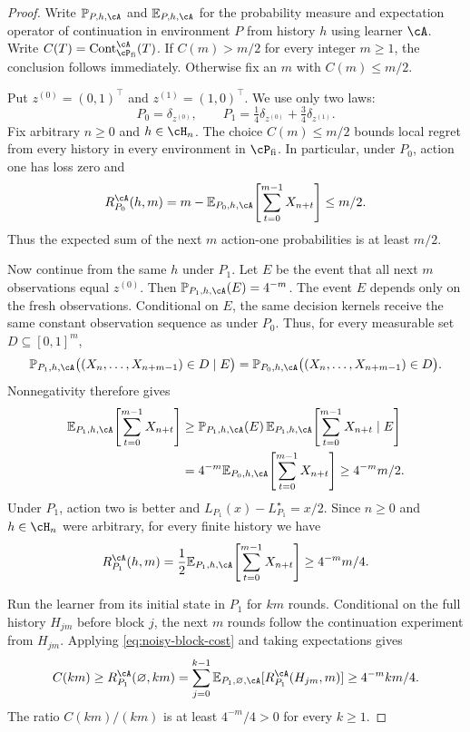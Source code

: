 \documentclass[11pt,twoside]{article}
\newcommand{\E}{\mathbb E}
\renewcommand{\P}{\mathbb P}
\theoremstyle{definition}
\theoremstyle{remark}
\DeclareMathOperator{\Cont}{Cont}
\begin{document}
\begin{proof}
Write $\P_{P,h,\cA}$ and $\E_{P,h,\cA}$ for the probability measure and
expectation operator of continuation in environment $P$ from history $h$
using learner $\cA$.
Write $C(T)=\Cont_{\cP_{\rm fi}}^{\cA}(T)$. If $C(m)>m/2$ for every
integer $m\ge1$, the conclusion follows immediately. Otherwise fix an
$m$ with $C(m)\le m/2$.

Put $z^{(0)}=(0,1)^\top$ and $z^{(1)}=(1,0)^\top$. We use only two laws:
\[
 P_0=\delta_{z^{(0)}},\qquad
 P_1=\tfrac14\delta_{z^{(0)}}+\tfrac34\delta_{z^{(1)}}.
\]
Fix arbitrary $n\ge0$ and $h\in\cH_n$. The choice $C(m)\le m/2$
bounds local regret from every history in every environment in
$\cP_{\rm fi}$. In particular, under $P_0$, action one has loss zero and
\[
 R_{P_0}^{\cA}(h,m)
 =m-\E_{P_0,h,\cA}\!\left[\sum_{t=0}^{m-1}X_{n+t}\right]\le m/2.
\]
Thus the expected sum of the next $m$ action-one probabilities is at least
$m/2$.

Now continue from the same $h$ under $P_1$. Let $E$ be the event
that all next $m$ observations equal $z^{(0)}$. Then
$\P_{P_1,h,\cA}(E)=4^{-m}$.
The event $E$ depends only on the fresh observations. Conditional on $E$,
the same decision kernels receive the same constant observation sequence
as under $P_0$. Thus, for every measurable set $D\subseteq[0,1]^m$,
\[
 \P_{P_1,h,\cA}\bigl((X_n,\ldots,X_{n+m-1})\in D\mid E\bigr)
 =\P_{P_0,h,\cA}\bigl((X_n,\ldots,X_{n+m-1})\in D\bigr).
\]
Nonnegativity therefore gives
\[
 \begin{aligned}
 \E_{P_1,h,\cA}\!\left[\sum_{t=0}^{m-1}X_{n+t}\right]
 &\ge \P_{P_1,h,\cA}(E)\,
       \E_{P_1,h,\cA}\!\left[\sum_{t=0}^{m-1}X_{n+t}\mid E\right]\\
 &=4^{-m}\E_{P_0,h,\cA}\!\left[\sum_{t=0}^{m-1}X_{n+t}\right]
 \ge 4^{-m}m/2.
 \end{aligned}
\]
Under $P_1$, action two is better and
$L_{P_1}(x)-L_{P_1}^\star=x/2$. Since $n\ge0$ and $h\in\cH_n$
were arbitrary, for every finite history we have
\begin{equation}
 R_{P_1}^{\cA}(h,m)
 =\frac12\E_{P_1,h,\cA}\!\left[\sum_{t=0}^{m-1}X_{n+t}\right]
 \ge 4^{-m}m/4.
 \label{eq:noisy-block-cost}
\end{equation}

Run the learner from its initial state in $P_1$ for $km$ rounds.
Conditional on the full history $H_{jm}$ before block $j$, the next $m$
rounds follow the continuation experiment from $H_{jm}$. Applying
\cref{eq:noisy-block-cost} and taking expectations gives
\[
 C(km)\ge R_{P_1}^{\cA}(\varnothing,km)
 =\sum_{j=0}^{k-1}\E_{P_1,\varnothing,\cA}[R_{P_1}^{\cA}(H_{jm},m)]
 \ge 4^{-m}km/4.
\]
The ratio $C(km)/(km)$ is at least $4^{-m}/4>0$ for every $k\ge1$.
\end{proof}
\end{document}
